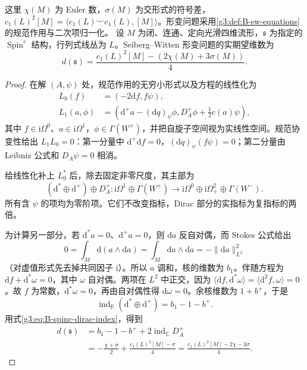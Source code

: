\begin{proposition}\label{g3:prop:B-sw-expected-dimension}
	这里 \(\chi(M)\) 为 Euler 数，\(\sigma(M)\) 为交形式的符号差，\(c_1(L)^2[M]=\langle c_1(L)\smile c_1(L),[M]\rangle\)。形变问题采用\cref{g3:def:B-sw-equations}的规范作用与二次项归一化。
 设 \(M\) 为闭、连通、定向光滑四维流形，\(\mathfrak s\) 为指定的
 \(\operatorname{Spin}^c\) 结构，行列式线丛为 \(L\)。Seiberg--Witten 形变问题的实期望维数为
 \begin{equation}\label{g3:eq:B-sw-dimension}
 d(\mathfrak s)=\frac{c_1(L)^2[M]-(2\chi(M)+3\sigma(M))}{4}.
 \end{equation}
\end{proposition}
\begin{proof}
 在解 \((A,\psi)\) 处，规范作用的无穷小形式以及方程的线性化为
 \[
 \begin{aligned}
 L_0(f)&=(-2\mathrm df,f\psi),\\
 L_1(a,\phi)&=
 \left(\mathrm d^+a-(\mathrm dq)_\psi\phi,
       D_A^+\phi+\tfrac12c(a)\psi\right),
 \end{aligned}
 \]
 其中 \(f\in\mathrm i\Omega^0\)、\(a\in\mathrm i\Omega^1\)，\(\phi\in\Gamma(W^+)\)，并把自旋子空间视为实线性空间。规范协变性给出 \(L_1L_0=0\)：第一分量中 \(\mathrm d^+\mathrm df=0\)，\((\mathrm dq)_\psi(f\psi)=0\)；第二分量由 Leibniz 公式和 \(D_A\psi=0\) 相消。

 给线性化补上 \(L_0^*\) 后，除去固定非零尺度，其主部为
 \[
 (\mathrm d^*\oplus\mathrm d^+)\oplus D_A^+:
 \mathrm i\Omega^1\oplus\Gamma(W^+)
 \longrightarrow
 \mathrm i\Omega^0\oplus\mathrm i\Omega^2_+\oplus\Gamma(W^-).
 \]
 所有含 \(\psi\) 的项均为零阶项。它们不改变指标，Dirac 部分的实指标为复指标的两倍。

 为计算另一部分，若 \(\mathrm d^*a=0\)、\(\mathrm d^+a=0\)，则 \(\mathrm da\) 反自对偶，而 Stokes 公式给出
 \[
 0=\int_M\mathrm d(a\wedge\mathrm da)
   =\int_M\mathrm da\wedge\mathrm da
   =-\|\mathrm da\|_{L^2}^2
 \]
 （对虚值形式先去掉共同因子 \(\mathrm i\)）。所以 \(a\) 调和，核的维数为 \(b_1\)。伴随方程为
 \(\mathrm df+\mathrm d^*\omega=0\)，其中 \(\omega\) 自对偶。两项在 \(L^2\) 中正交，因为
 \(\langle\mathrm df,\mathrm d^*\omega\rangle
 =\langle\mathrm d^2f,\omega\rangle=0\)。故 \(f\) 为常数，\(\mathrm d^*\omega=0\)，再由自对偶性得 \(\mathrm d\omega=0\)。余核维数为 \(1+b^+\)，于是
 \[
 \operatorname{ind}_{\mathbb R}(\mathrm d^*\oplus\mathrm d^+)
 =b_1-1-b^+.
 \]
 用式\eqref{g3:eq:B-spinc-dirac-index}，得到
 \[
 \begin{aligned}
 d(\mathfrak s)
 &=b_1-1-b^++2\operatorname{ind}_{\mathbb C}D_A^+\\
 &=-\frac{\chi+\sigma}{2}+\frac{c_1(L)^2[M]-\sigma}{4}
 =\frac{c_1(L)^2[M]-2\chi-3\sigma}{4}.
 \end{aligned}
 \]
\end{proof}

